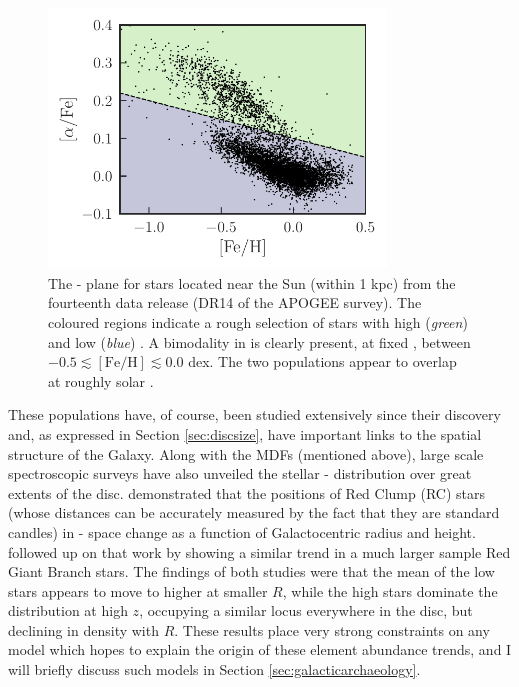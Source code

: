 \begin{figure}
    \centering
    \includegraphics[width=0.8\textwidth]{thesis/Plots/afe_split_colors.pdf}
    \caption[The \feh{} and \afe{} abundances of stars in the solar vicinity from APOGEE DR14, indicating the bimodality in \afe{} at fixed \feh{}]{The \feh{}-\afe{} plane for stars located near the Sun (within 1 kpc) from the fourteenth data release (DR14 of the APOGEE survey). The coloured regions indicate a rough selection of stars with high (\emph{green}) and low (\emph{blue}) \afe{}. A bimodality in \afe{} is clearly present, at fixed \feh{}, between $-0.5 \lesssim \mathrm{[Fe/H]} \lesssim 0.0$ dex. The two populations appear to overlap at roughly solar \feh{}.}
    \label{fig:afe_split}
\end{figure}

These populations have, of course, been studied extensively since their discovery \citep[e.g.][]{1998A&A...338..161F,2003A&A...410..527B,2005A&A...433..185B,2013A&A...560A.109H,2014A&A...562A..71B,2014A&A...564A.115A,2014ApJ...796...38N,2015ApJ...808..132H} and, as expressed in Section \ref{sec:discsize}, have important links to the spatial structure of the Galaxy. Along with the MDFs (mentioned above), large scale spectroscopic surveys have also unveiled the stellar \feh{}-\afe{} distribution over great extents of the disc.  \citet{2014ApJ...796...38N} demonstrated that the positions of Red Clump (RC) stars (whose distances can be accurately measured by the fact that they are standard candles) in \feh{}-\afe{} space change as a function of Galactocentric radius and height. \citet{2015ApJ...808..132H} followed up on that work by showing a similar trend in a much larger sample Red Giant Branch stars. The findings of both studies were that the mean \feh{} of the low \afe{} stars appears to move to higher \feh{} at smaller $R$, while the high \afe{} stars dominate the distribution at high $z$, occupying a similar locus everywhere in the disc, but declining in density with $R$. These results place very strong constraints on any model which hopes to explain the origin of these element abundance trends, and I will briefly discuss such models in Section \ref{sec:galacticarchaeology}.

